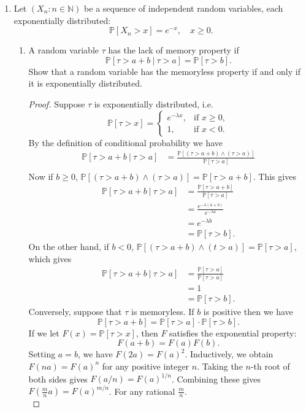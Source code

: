 \documentclass[11pt,letterpaper]{report}
\newcommand{\naturals}{\mathbb{N}}
\newcommand{\prob}{\mathbb{P}}{}
\begin{document}
\begin{enumerate}
	\item Let $(X_n: n\in \naturals)$ be a sequence of independent random variables, each exponentially distributed:
	\[
	\prob[X_n>x] =e^{-x},\quad x\geq 0.
	\]
	\begin{enumerate}
		\item A random variable $\tau$ has the lack of memory property if
		\[
		\prob[\tau>a+b\ |\ \tau>a] = \prob[\tau>b].
		\]
		Show that a random variable has the memoryless property if and only if it is exponentially distributed.
		\begin{proof}
			Suppose $\tau$ is exponentially distributed, i.e.
			\[
			\prob[\tau > x] = \begin{cases}
				e^{-\lambda x},&\text{if }x\geq 0,\\
				1,&\text{if }x <0.
			\end{cases}
			\]
			By the definition of conditional probability we have 
			\begin{align*}
				\prob[\tau>a+b\ |\ \tau > a] &= \frac{\prob[(\tau>a+b) \land (\tau>a)]}{\prob[\tau>a]}\\
			\end{align*}
			Now if $b\geq 0$, $\prob[(\tau>a+b)\land (\tau>a)] = \prob[\tau>a+b]$. This gives
			\begin{align*}
				\prob[\tau>a+b\ |\ \tau > a] &= \frac{\prob[\tau>a+b]}{\prob[\tau>a]}\\
				&= \frac{e^{-\lambda(a+b)}}{e^{-\lambda a}}\\
				&= e^{-\lambda b}\\
				&= \prob[\tau>b].
			\end{align*}
			On the other hand, if $b<0$, $\prob[(\tau>a+b)\land(t>a)] = \prob[\tau>a]$, which gives
			\begin{align*}
				\prob[\tau>a+b\ |\ \tau > a] &=\frac{\prob[\tau>a]}{\prob[\tau>a]}\\
				&= 1\\
				&= \prob[\tau>b].
			\end{align*}
			Conversely, suppose that $\tau$ is memoryless. If $b$ is positive then we have
			\[
			\prob[\tau>a+b] = \prob[\tau>a]\cdot \prob[\tau>b].
			\]
			If we let $F(x)= \prob[\tau>x]$, then $F$ satisfies the exponential property:
			\[
			F(a+b) = F(a)F(b).
			\]
			Setting $a=b$, we have $F(2a) = F(a)^2$. Inductively, we obtain $F(na) = F(a)^n$ for any positive integer $n$. Taking the $n$-th root of both sides gives $F(a/n) = F(a)^{1/n}$. Combining these gives $F(\frac{m}{n}a) = F(a)^{m/n}$. For any rational $\frac{m}{n}$.\\


\end{proof}
\end{enumerate}
\end{enumerate}
\end{document}
